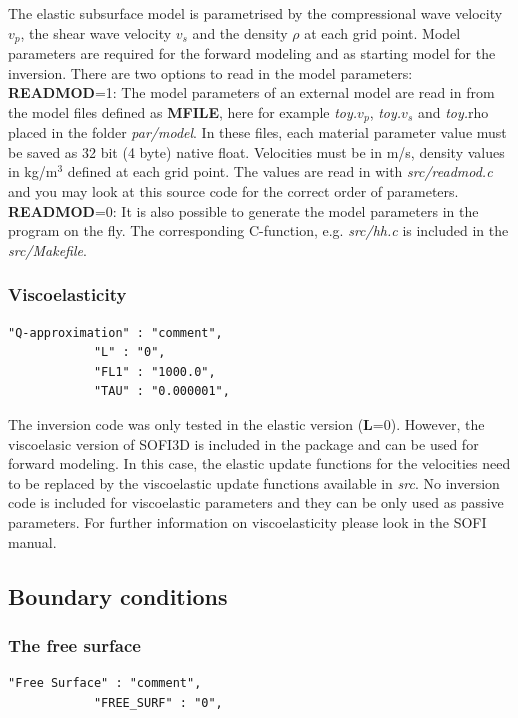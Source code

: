 The elastic subsurface model is parametrised by the compressional wave velocity $v_p$, the shear wave velocity $v_s$ and the density $\rho$ at each grid point. Model parameters are required for the forward modeling and as starting model for the inversion. There are two options to read in the model parameters:\\
\textbf{READMOD}=1: The model parameters of an external model are read in from the model files defined as \textbf{MFILE}, here for example  \textit{toy.$v_p$}, \textit{toy.$v_s$} and \textit{toy.$\text{rho}$} placed in the folder \textit{par/model}. In these files, each material parameter value must be saved as 32 bit (4 byte) native float.
Velocities must be in m/s, density values in kg/m$^3$ defined at each grid point. The values are read in with \textit{src/readmod.c} and you may look at this source code for the correct order of parameters.\\
\textbf{READMOD}=0: It is also possible to generate the model parameters in the program on the fly. The corresponding C-function, e.g. \textit{src/hh.c} is included in the \textit{src/Makefile}. 
\subsubsection*{Viscoelasticity}
\begin{verbatim}
"Q-approximation" : "comment",
			"L" : "0",
			"FL1" : "1000.0", 
			"TAU" : "0.000001",
\end{verbatim}

The inversion code was only tested in the elastic version (\textbf{L}=0). However, the viscoelasic version of SOFI3D is included in the package and can be used for forward modeling. In this case, the elastic update functions for the velocities need to be replaced by the viscoelastic update functions available in \textit{src}. No inversion code is  included for viscoelastic parameters and they can be only used as passive parameters. For further information on viscoelasticity please look in the SOFI manual.
\subsection{Boundary conditions}
\subsubsection*{The free surface}
\begin{verbatim}
"Free Surface" : "comment",
			"FREE_SURF" : "0",
\end{verbatim}

